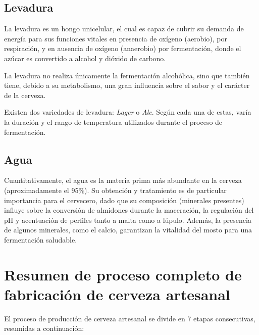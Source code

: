         \subsection{Levadura}
            \par La levadura es un hongo unicelular, el cual es capaz de cubrir su demanda de energía para sus funciones vitales en presencia de oxígeno (aerobio), por respiración, y en ausencia de oxígeno (anaerobio) por fermentación, donde el azúcar es convertido a alcohol y dióxido de carbono.
            
            \par La levadura no realiza únicamente la fermentación alcohólica, sino que también tiene, debido a su metabolismo, una gran influencia sobre el sabor y el carácter de la cerveza.
            
            \par Existen dos variedades de levadura: \textit{Lager} o \textit{Ale}. Según cada una de estas, varía la duración y el rango de temperatura utilizados durante el proceso de fermentación.
            
        \subsection{Agua}
            \par Cuantitativamente, el agua es la materia prima más abundante en la cerveza (aproximadamente el 95\%). Su obtención y tratamiento es de particular importancia para el cervecero, dado que su composición (minerales presentes) influye sobre la conversión de almidones durante la maceración, la regulación del pH y acentuación de perfiles tanto a malta como a lúpulo. Además, la presencia de algunos minerales, como el calcio, garantizan la vitalidad del mosto para una fermentación saludable.
            
    \section{Resumen de proceso completo de fabricación de cerveza artesanal}
        \par El proceso de producción de cerveza artesanal se divide en 7 etapas consecutivas, resumidas a continuación:
        
